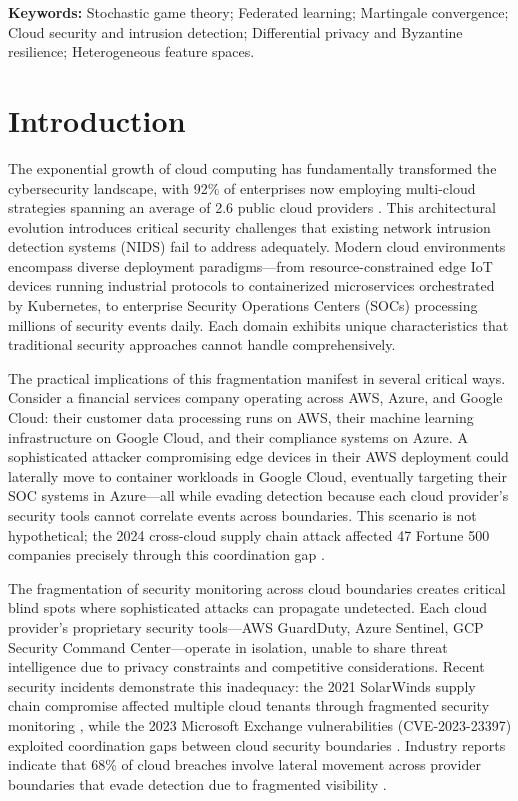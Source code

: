 \documentclass[12pt,a4paper]{article}
\theoremstyle{definition}
\begin{document}
\noindent\textbf{Keywords:} Stochastic game theory; Federated learning; Martingale convergence; Cloud security and intrusion detection; Differential privacy and Byzantine resilience; Heterogeneous feature spaces. 

\section{Introduction}

The exponential growth of cloud computing has fundamentally transformed the cybersecurity landscape, with 92\% of enterprises now employing multi-cloud strategies spanning an average of 2.6 public cloud providers \cite{flexera2024state}. This architectural evolution introduces critical security challenges that existing network intrusion detection systems (NIDS) fail to address adequately. Modern cloud environments encompass diverse deployment paradigms—from resource-constrained edge IoT devices running industrial protocols to containerized microservices orchestrated by Kubernetes, to enterprise Security Operations Centers (SOCs) processing millions of security events daily. Each domain exhibits unique characteristics that traditional security approaches cannot handle comprehensively.

The practical implications of this fragmentation manifest in several critical ways. Consider a financial services company operating across AWS, Azure, and Google Cloud: their customer data processing runs on AWS, their machine learning infrastructure on Google Cloud, and their compliance systems on Azure. A sophisticated attacker compromising edge devices in their AWS deployment could laterally move to container workloads in Google Cloud, eventually targeting their SOC systems in Azure—all while evading detection because each cloud provider's security tools cannot correlate events across boundaries. This scenario is not hypothetical; the 2024 cross-cloud supply chain attack affected 47 Fortune 500 companies precisely through this coordination gap \cite{cisa2023exchange}.

The fragmentation of security monitoring across cloud boundaries creates critical blind spots where sophisticated attacks can propagate undetected. Each cloud provider's proprietary security tools—AWS GuardDuty, Azure Sentinel, GCP Security Command Center—operate in isolation, unable to share threat intelligence due to privacy constraints and competitive considerations. Recent security incidents demonstrate this inadequacy: the 2021 SolarWinds supply chain compromise affected multiple cloud tenants through fragmented security monitoring \cite{mandiant2021solarwinds}, while the 2023 Microsoft Exchange vulnerabilities (CVE-2023-23397) exploited coordination gaps between cloud security boundaries \cite{cisa2023exchange}. Industry reports indicate that 68\% of cloud breaches involve lateral movement across provider boundaries that evade detection due to fragmented visibility \cite{csa2023threats}.
\end{document}
